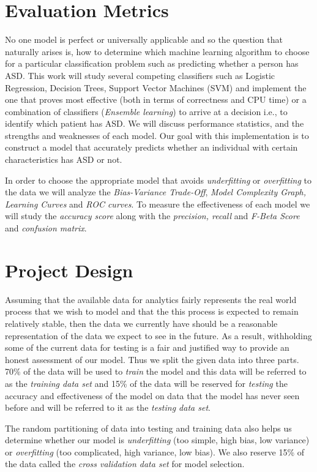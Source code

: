 \documentclass[12pt, oneside]{article}
\theoremstyle{definition}
\begin{document}
\section{Evaluation Metrics}
No one model is perfect or universally applicable and so the question that naturally arises is, how to determine which machine learning algorithm to choose for a particular classification problem such as predicting whether a person has ASD. This work will study several competing classifiers such as Logistic Regression, Decision Trees, Support Vector Machines (SVM) and implement the one that proves most effective (both in terms of correctness and CPU time) or a combination of classifiers ({\it Ensemble learning}) to arrive at a decision i.e., to identify which patient has ASD. We will discuss performance statistics, and the strengths and weaknesses of each model. Our goal with this implementation is to construct a model that accurately predicts whether an individual with certain characteristics has ASD or not. 

In order to choose the appropriate model that avoids {\it underfitting} or {\it overfitting} to the data  we will analyze the {\it Bias-Variance Trade-Off}, {\it Model Complexity Graph, Learning Curves} and {\it ROC curves}. To measure the effectiveness of each model we will study the {\it accuracy score} along with the {\it precision, recall} and {\it F-Beta Score} and {\it{confusion matrix}}.

\section{Project Design}
Assuming that the available data for analytics fairly represents the real world process that we wish to model and that the this process is expected to remain relatively stable, then the data we currently have should be a reasonable representation of the data we expect to see in the future. As a result, withholding some of the current data for testing is a fair and justified way to provide an honest assessment of our model. Thus we split the given data into three parts. 70\% of the data will be used to {\it train} the model and this data will be referred to as the {\it training data set} and 15\% of the data will be reserved for {\it testing} the accuracy and effectiveness of the model on data that the model has never seen before and will be referred to it as the {\it testing data set}.

The random partitioning of data into testing and training data also helps us determine whether our model is {\it underfitting} (too simple, high bias, low variance) or {\it overfitting} (too complicated, high variance, low bias).
We also reserve 15\% of the data called the {\it cross validation data set} for model selection.
\end{document}
